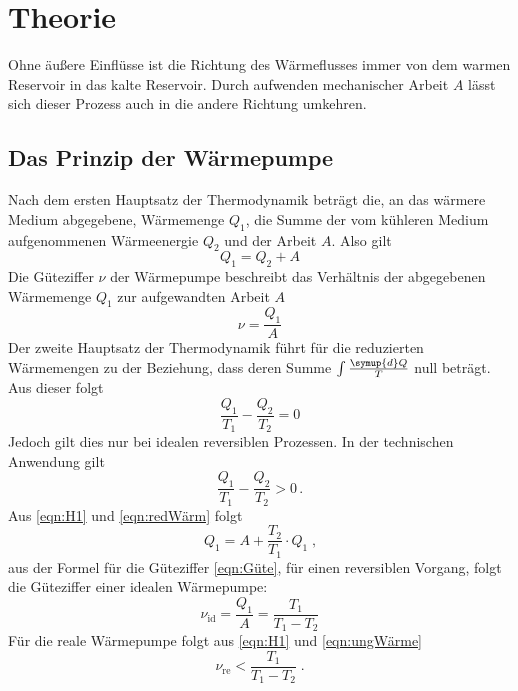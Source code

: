\section{Theorie}
\label{sec:Theorie}
Ohne äußere Einflüsse ist die Richtung des Wärmeflusses immer von dem warmen Reservoir in das kalte Reservoir.
Durch aufwenden mechanischer Arbeit $A$ lässt sich dieser Prozess auch in die andere Richtung umkehren.
\subsection{Das Prinzip der Wärmepumpe}
Nach dem ersten Hauptsatz der Thermodynamik beträgt die, an das wärmere Medium abgegebene, Wärmemenge $Q_1$, die Summe der vom kühleren Medium aufgenommenen
Wärmeenergie $Q_2$ und der Arbeit $A$. Also gilt
\begin{equation}
    Q_1=Q_2+A
    \label{eqn:H1}
\end{equation}
Die Güteziffer $\nu$ der Wärmepumpe beschreibt das Verhältnis der abgegebenen
Wärmemenge $Q_1$ zur aufgewandten Arbeit $A$
\begin{equation}
    \nu=\frac{Q_1}{A}
    \label{eqn:Güte}
\end{equation}
Der zweite Hauptsatz der Thermodynamik führt für die reduzierten Wärmemengen 
zu der Beziehung, dass deren Summe $\int \frac{\symup{d}Q}{T}$ null beträgt. 
Aus dieser folgt
\begin{equation}
    \frac{Q_1}{T_1} - \frac{Q_2}{T_2} = 0
    \label{eqn:redWärm}
\end{equation}
Jedoch gilt dies nur bei idealen reversiblen Prozessen. In der technischen Anwendung gilt
\begin{equation}
    \frac{Q_1}{T_1} - \frac{Q_2}{T_2} > 0 \, .
    \label{eqn:ungWärme}
\end{equation}
Aus \ref{eqn:H1} und \ref{eqn:redWärm} folgt
\begin{equation*}
    Q_1 = A + \frac{T_2}{T_1} \cdot Q_1 \; \text{,}
\end{equation*}
aus der Formel für die Güteziffer \ref{eqn:Güte}, für einen reversiblen Vorgang, folgt die Güteziffer einer idealen Wärmepumpe:
\begin{equation}
    \nu_\text{id} = \frac{Q_1}{A} = \frac{T_1}{T_1 - T_2}
    \label{eqn:Id}
\end{equation}
Für die reale Wärmepumpe folgt aus \ref{eqn:H1} und \ref{eqn:ungWärme}
\begin{equation}
    \nu_\text{re} < \frac{T_1}{T_1 - T_2} \; \text{.}
    \label{eqn:Re}
\end{equation}
